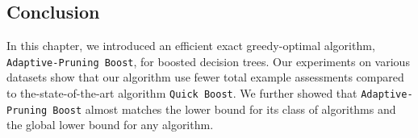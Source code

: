 \subsection{Conclusion}
In this chapter, we introduced an efficient exact greedy-optimal algorithm, \texttt{Adaptive-Pruning Boost}, for boosted decision trees. Our experiments on various datasets show that our algorithm use fewer total example assessments compared to the-state-of-the-art algorithm \texttt{Quick Boost}. We further showed that \texttt{Adaptive-Pruning Boost} almost matches the lower bound for its class of algorithms and the global lower bound for any algorithm.
